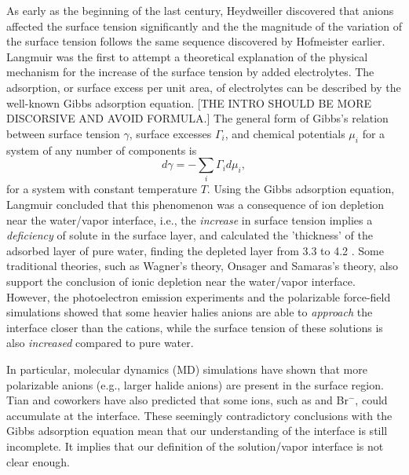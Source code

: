 As early as the beginning of the last century, Heydweiller discovered that anions affected the surface tension significantly
and the the magnitude of the variation of the surface tension follows the same sequence discovered by Hofmeister earlier\cite{dosSantos10}.
Langmuir\cite{Langmuir1917} was the first to attempt a theoretical explanation of the physical mechanism for the increase of the surface tension by added electrolytes.
The adsorption, or surface excess per unit area, of electrolytes can be described by the well-known Gibbs adsorption equation\cite{Gibbs1928, Adam1941}.
[THE INTRO SHOULD BE MORE DISCORSIVE AND AVOID FORMULA.]
The general form of Gibbs's relation between surface tension $\gamma$, surface excesses $\Gamma_i$, and chemical potentials $\mu_i$ for a system of any number of components is
\begin{equation}
d\gamma = -\sum_i \Gamma_i d\mu_i,
\label{eq:gibbs_relation}
\end{equation}
for a system with constant temperature $T$.
Using the Gibbs adsorption equation, Langmuir concluded that this phenomenon was a consequence of ion depletion 
near the water/vapor interface, i.e., the \emph{increase} in surface tension 
implies a \emph{deficiency} of solute in the surface layer\cite{Jarvis1968}, and
calculated the 'thickness' of the adsorbed layer of pure water, finding 
the depleted layer from 3.3 to 4.2 \A. 
%
Some traditional theories, such as Wagner's theory\cite{Wagner1924,dosSantos10}, 
Onsager and Samaras's theory\cite{Onsager1934}, 
also support the conclusion of ionic depletion near the water/vapor interface.
However, the photoelectron emission experiments\cite{Markovich1991,Ghosal05,Garrett04} and the polarizable 
force-field simulations\cite{Perera1991,Dang1993,Jungwirth2001,Jungwirth2002,PJ06,Horinek07,Brown08,CST11} showed that 
some heavier halies anions are able to \emph{approach} the interface closer than the cations, 
while the surface tension of these solutions is also \emph{increased} compared to pure water. 

%
In particular, molecular dynamics (MD) simulations have shown that more polarizable anions (e.g., larger halide anions) 
are present in the surface region\cite{Jungwirth2001,Jungwirth2002}. 
Tian and coworkers\cite{CST11} have also predicted that some ions, such as \I and Br$^{-}$, could accumulate at the interface.
These seemingly contradictory conclusions with the Gibbs adsorption equation mean that our understanding of the interface is still incomplete. 
It implies that our definition of the solution/vapor interface is not clear enough. 

